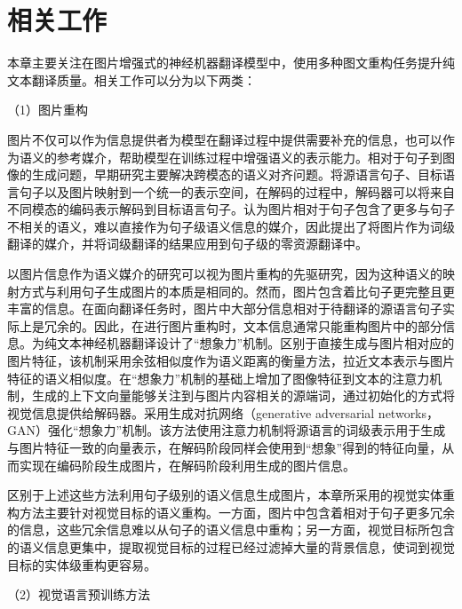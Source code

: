 \section{相关工作}
本章主要关注在图片增强式的神经机器翻译模型中，使用多种图文重构任务提升纯文本翻译质量。相关工作可以分为以下两类：

{\sffamily （1）图片重构}

图片不仅可以作为信息提供者为模型在翻译过程中提供需要补充的信息，也可以作为语义的参考媒介，帮助模型在训练过程中增强语义的表示能力。相对于句子到图像的生成问题，早期研究主要解决跨模态的语义对齐问题。将源语言句子、目标语言句子以及图片映射到一个统一的表示空间，在解码的过程中，解码器可以将来自不同模态的编码表示解码到目标语言句子。认为图片相对于句子包含了更多与句子不相关的语义，难以直接作为句子级语义信息的媒介，因此提出了将图片作为词级翻译的媒介，并将词级翻译的结果应用到句子级的零资源翻译中。

以图片信息作为语义媒介的研究可以视为图片重构的先驱研究，因为这种语义的映射方式与利用句子生成图片的本质是相同的。然而，图片包含着比句子更完整且更丰富的信息。在面向翻译任务时，图片中大部分信息相对于待翻译的源语言句子实际上是冗余的。因此，在进行图片重构时，文本信息通常只能重构图片中的部分信息。为纯文本神经机器翻译设计了“想象力”机制。区别于直接生成与图片相对应的图片特征，该机制采用余弦相似度作为语义距离的衡量方法，拉近文本表示与图片特征的语义相似度。在“想象力”机制的基础上增加了图像特征到文本的注意力机制，生成的上下文向量能够关注到与图片内容相关的源端词，通过初始化的方式将视觉信息提供给解码器。采用生成对抗网络（generative adversarial networks，GAN）强化“想象力”机制。该方法使用注意力机制将源语言的词级表示用于生成与图片特征一致的向量表示，在解码阶段同样会使用到“想象”得到的特征向量，从而实现在编码阶段生成图片，在解码阶段利用生成的图片信息。

区别于上述这些方法利用句子级别的语义信息生成图片，本章所采用的视觉实体重构方法主要针对视觉目标的语义重构。一方面，图片中包含着相对于句子更多冗余的信息，这些冗余信息难以从句子的语义信息中重构；另一方面，视觉目标所包含的语义信息更集中，提取视觉目标的过程已经过滤掉大量的背景信息，使词到视觉目标的实体级重构更容易。


{\sffamily （2）视觉语言预训练方法}

